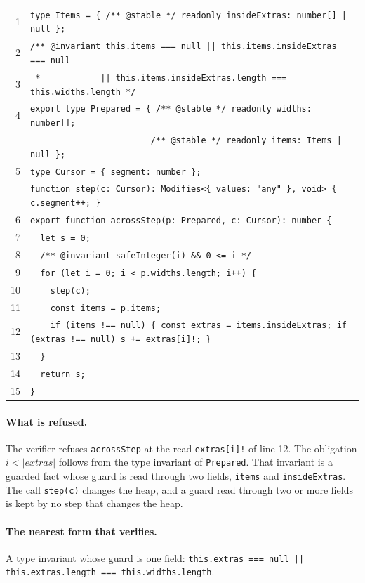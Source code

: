 \documentclass[10pt,a4paper]{article}
\theoremstyle{definition}
\theoremstyle{remark}
\newcommand{\len}[1]{|#1|}
\newcommand{\code}[1]{\texttt{#1}}
\newcommand{\entry}[1]{\paragraph{#1.}}
\begin{document}
{\footnotesize
\begin{tabular}{@{}r@{\hspace{1em}}l@{}}
1 & \code{type Items = \{ /** @stable */ readonly insideExtras: number[] | null \};} \\
2 & \code{/** @invariant this.items === null || this.items.insideExtras === null} \\
3 & \code{~*~~~~~~~~~~~~|| this.items.insideExtras.length === this.widths.length */} \\
4 & \code{export type Prepared = \{ /** @stable */ readonly widths: number[];} \\
  & \code{~~~~~~~~~~~~~~~~~~~~~~~~/** @stable */ readonly items: Items | null \};} \\
5 & \code{type Cursor = \{ segment: number \};} \\
  & \code{function step(c: Cursor): Modifies<\{ values: "any" \}, void> \{ c.segment++; \}} \\
6 & \code{export function acrossStep(p: Prepared, c: Cursor): number \{} \\
7 & \code{~~let s = 0;} \\
8 & \code{~~/** @invariant safeInteger(i) \&\& 0 <= i */} \\
9 & \code{~~for (let i = 0; i < p.widths.length; i++) \{} \\
10 & \code{~~~~step(c);} \\
11 & \code{~~~~const items = p.items;} \\
12 & \code{~~~~if (items !== null) \{ const extras = items.insideExtras; if (extras !== null) s += extras[i]!; \}} \\
13 & \code{~~\}} \\
14 & \code{~~return s;} \\
15 & \code{\}} \\
\end{tabular}}

\entry{What is refused} The verifier refuses \code{acrossStep} at the read
\code{extras[i]!} of line 12. The obligation $i<\len{\mathit{extras}}$
follows from the type invariant of \code{Prepared}. That invariant is
a guarded fact whose guard is read through two fields, \code{items}
and \code{insideExtras}. The call \code{step(c)} changes the heap, and
a guard read through two or more fields is kept by no step that
changes the heap.

\entry{The nearest form that verifies} A type invariant whose guard is one field:
\code{this.extras === null || this.extras.length === this.widths.length}.
\end{document}
